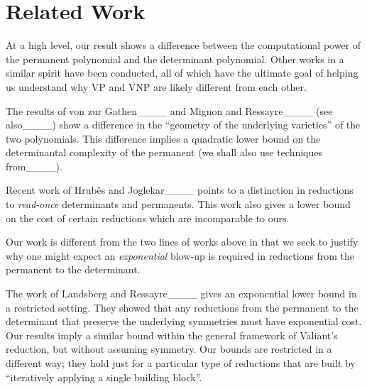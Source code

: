\section{Related Work}
At a high level, our result shows a difference between the computational power of the permanent polynomial and the determinant polynomial. Other works in a similar spirit have been conducted, all of which have the ultimate goal of helping us understand why VP and VNP are likely different from each other. 

The results of von zur Gathen____ and Mignon and Ressayre____ (see also____) show a difference in the ``geometry of the underlying varieties'' of the two polynomials. This difference implies a quadratic lower bound on the determinantal complexity of the permanent (we shall also use techniques from____).

Recent work of Hrub\v{e}s and Joglekar____ points to a distinction in reductions to \emph{read-once} determinants and permanents. This work also gives a lower bound on the cost of certain reductions which are incomparable to ours. 

Our work is different from the two lines of works above in that we seek to justify why one might expect an \emph{exponential} blow-up is required in reductions from the permanent to the determinant.


The work of Landsberg and Ressayre____ gives an exponential lower bound in a restricted setting. They showed that any reductions from the permanent to the determinant that preserve the underlying symmetries must have exponential cost. Our results imply a similar bound within the general framework of Valiant's reduction, but without assuming symmetry.
Our bounds are restricted in a different way; they hold just for a particular type
of reductions that are built by ``iteratively 
applying a single building block''.